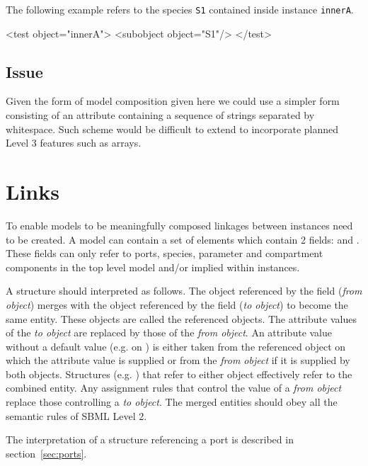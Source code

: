 \documentclass{cekarticle}
\begin{document}
The following example refers to the species \texttt{S1} contained inside instance \texttt{innerA}.

\begin{example}
<test object="innerA">
    <subobject object="S1"/>
</test>
\end{example}

\subsection{Issue}

Given the form of model composition given here we could use a simpler form consisting of an attribute containing a
sequence of  strings separated by whitespace. Such scheme would be difficult to extend to incorporate planned
Level 3 features such as arrays.

\section{Links}
\label{sec:links}

To enable models to be meaningfully composed linkages between instances need to be
created.  A model can contain a set of  elements which contain 2
fields:  and .
These fields can only refer to ports, species, parameter and compartment components
in the top level model and/or 
implied within instances.

A  structure should interpreted as follows.  The object referenced by the
 field (\emph{from object})
merges with the object referenced by the  field (\emph{to object}) to
become the same entity.  These objects are called the referenced objects. 
The attribute values 
of the \emph{to object}
are replaced by those of the \emph{from object}.  An attribute value without a default
value (e.g.  on
) is either taken from the referenced object on which the attribute value is
supplied or from the \emph{from object} if it is supplied
by both objects.  Structures (e.g. ) that refer to either
object effectively refer to the combined entity.
Any assignment rules that control the value of a \emph{from object} replace those
controlling a \emph{to object}.  The merged entities should obey all the semantic rules
of SBML Level 2.

The interpretation of a  structure referencing a port is described 
in section~\ref{sec:ports}.
\end{document}
